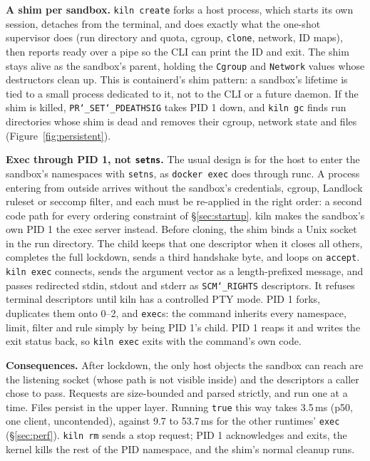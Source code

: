 \documentclass[10pt,letterpaper]{article}
\newcommand{\code}[1]{\texttt{#1}}
\newcommand{\us}{\char`\_}
\begin{document}
\textbf{A shim per sandbox.} \code{kiln create} forks a host process, which
starts its own session, detaches from the terminal, and does exactly what the
one-shot supervisor does (run directory and quota, cgroup, \code{clone},
network, ID maps), then reports ready over a pipe so the CLI can print the ID
and exit. The shim stays alive as the sandbox's parent, holding the
\code{Cgroup} and \code{Network} values whose destructors clean up. This is
containerd's shim pattern: a sandbox's lifetime is tied to a small process
dedicated to it, not to the CLI or a future daemon. If the shim is killed,
\code{PR\us{}SET\us{}PDEATHSIG} takes PID 1 down, and \code{kiln gc} finds run
directories whose shim is dead and removes their cgroup, network state and files
(Figure~\ref{fig:persistent}).

\textbf{Exec through PID 1, not \code{setns}.} The usual design is for the host
to enter the sandbox's namespaces with \code{setns}, as \code{docker exec} does
through runc. A process entering from outside arrives without the sandbox's
credentials, cgroup, Landlock ruleset or seccomp filter, and each must be
re-applied in the right order: a second code path for every ordering constraint
of \S\ref{sec:startup}. kiln makes the sandbox's own PID 1 the exec server
instead. Before cloning, the shim binds a Unix socket in the run directory. The
child keeps that one descriptor when it closes all others, completes the full
lockdown, sends a third handshake byte, and loops on \code{accept}. \code{kiln
exec} connects, sends the argument vector as a length-prefixed message, and
passes redirected stdin, stdout and stderr as \code{SCM\us{}RIGHTS} descriptors.
It refuses terminal descriptors until kiln has a controlled PTY mode. PID 1
forks, duplicates them onto 0--2, and \code{exec}s: the command inherits every
namespace, limit, filter and rule simply by being PID 1's child. PID 1 reaps it
and writes the exit status back, so \code{kiln exec} exits with the command's
own code.

\textbf{Consequences.} After lockdown, the only host objects the sandbox can
reach are the listening socket (whose path is not visible inside) and the
descriptors a caller chose to pass. Requests are size-bounded and parsed
strictly, and run one at a time. Files persist in the upper layer. Running
\code{true} this way takes 3.5\,ms (p50, one client, uncontended), against 9.7
to 53.7\,ms for the other runtimes' \code{exec} (\S\ref{sec:perf}). \code{kiln rm} sends a stop request; PID 1 acknowledges and exits, the
kernel kills the rest of the PID namespace, and the shim's normal cleanup runs.
\end{document}
